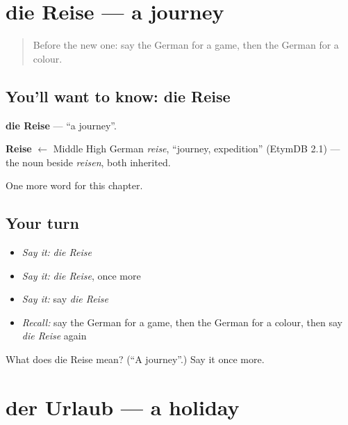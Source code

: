 \section[die Reise]{die Reise — a journey}

\label{lesson:GE-C103-reise}



\begin{quote}
Before the new one: say the German for a game, then the German for a colour.
\end{quote}

\subsection*{You'll want to know: die Reise}
\textbf{die Reise} — \textquotedblleft{}a journey\textquotedblright{}.

\begin{cousinweb}
\textbf{Reise} $\leftarrow$ Middle High German \emph{reise}, \textquotedblleft{}journey, expedition\textquotedblright{} (EtymDB 2.1) — the noun beside \emph{reisen}, both inherited.
\end{cousinweb}

\begin{grammarlens}[title={What you've built}]
One more word for this chapter.
\end{grammarlens}

\subsection*{Your turn}
\begin{itemize}
\raggedright
  \item \emph{Say it:} \emph{die Reise}
  \item \emph{Say it:} \emph{die Reise}, once more
  \item \emph{Say it:} say \emph{die Reise}
  \item \emph{Recall:} say the German for a game, then the German for a colour, then say \emph{die Reise} again
\end{itemize}

\begin{tcolorbox}[breakable,colback=teal!4,colframe=teal!35!black,title={Before you move on}]
What does die Reise mean? (\textquotedblleft{}A journey\textquotedblright{}.) Say it once more.
\end{tcolorbox}
\section[der Urlaub]{der Urlaub — a holiday}

